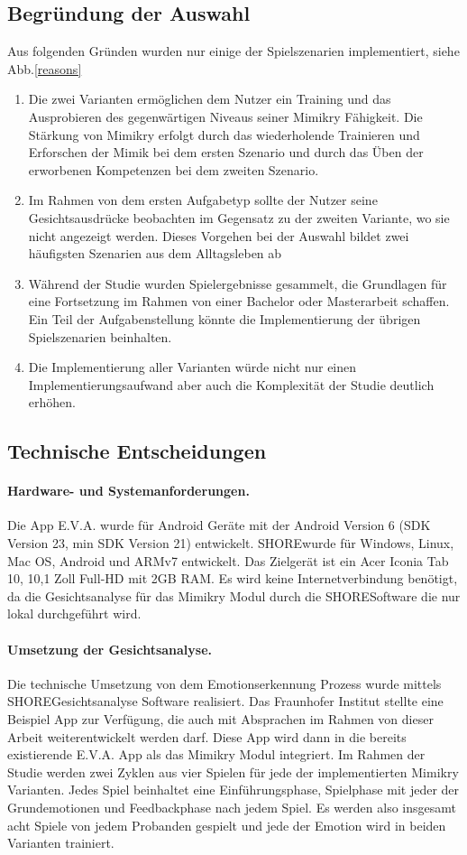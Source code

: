 \subsection{Begründung der Auswahl}
Aus folgenden Gründen wurden nur einige der Spielszenarien implementiert, siehe Abb.\ref{reasons} 
\begin{enumerate}
    \item Die zwei Varianten ermöglichen dem Nutzer ein Training und das Ausprobieren des gegenwärtigen Niveaus seiner Mimikry Fähigkeit. Die Stärkung von Mimikry erfolgt durch das wiederholende Trainieren und Erforschen der Mimik bei dem ersten Szenario und durch das Üben der erworbenen Kompetenzen bei dem zweiten Szenario.
    \item Im Rahmen von dem ersten Aufgabetyp sollte der Nutzer seine Gesichtsausdrücke beobachten im Gegensatz zu der zweiten Variante, wo sie nicht angezeigt werden.
    Dieses Vorgehen bei der Auswahl bildet zwei häufigsten Szenarien aus dem Alltagsleben ab
    \item Während der Studie wurden Spielergebnisse gesammelt, die Grundlagen für eine Fortsetzung im Rahmen von einer Bachelor oder Masterarbeit schaffen. Ein Teil der Aufgabenstellung könnte die Implementierung der übrigen Spielszenarien beinhalten.
    \item Die Implementierung aller Varianten würde nicht nur einen Implementierungsaufwand aber auch die Komplexität der Studie deutlich erhöhen.
    \label{reasons}
\end{enumerate}

\subsection{Technische Entscheidungen}
\paragraph{Hardware- und Systemanforderungen.}Die App E.V.A. wurde für Android Geräte mit der Android Version 6 (SDK Version 23, min SDK Version 21) entwickelt. 
SHORE\re wurde für Windows, Linux, Mac OS, Android und ARMv7 entwickelt.
Das Zielgerät ist ein Acer Iconia Tab 10, 10,1 Zoll Full-HD mit 2GB RAM. 
Es wird keine Internetverbindung benötigt, da die Gesichtsanalyse für das Mimikry Modul durch die SHORE\re Software die nur lokal durchgeführt wird. 
\paragraph{Umsetzung der Gesichtsanalyse.}Die technische Umsetzung von dem Emotionserkennung Prozess wurde mittels SHORE\re Gesichtsanalyse Software realisiert. Das Fraunhofer Institut stellte eine Beispiel App zur Verfügung, die auch mit Absprachen im Rahmen von dieser Arbeit weiterentwickelt werden darf. Diese App wird dann in die bereits existierende E.V.A. App als das Mimikry Modul integriert. Im Rahmen der Studie werden zwei Zyklen aus vier Spielen für jede der implementierten Mimikry Varianten. Jedes Spiel beinhaltet eine Einführungsphase, Spielphase mit jeder der Grundemotionen und Feedbackphase nach jedem Spiel. Es werden also insgesamt acht Spiele von jedem Probanden gespielt und jede der Emotion wird in beiden Varianten trainiert.

